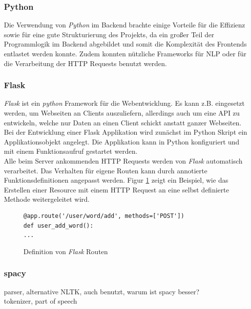 \subsubsection{Python}
\label{sec:python}

Die Verwendung von \textit{Python}\cite{vanRossum2011} im Backend brachte einige Vorteile für die Effizienz sowie für eine gute Strukturierung des Projekts, da ein großer Teil der Programmlogik im Backend abgebildet und somit die Komplexität des Frontends entlastet werden konnte. Zudem konnten nützliche Frameworks für NLP oder für die Verarbeitung der HTTP Requests benutzt werden.

\subsubsection{Flask}
\label{sec:flask}

\textit{Flask} ist ein \textit{python} Framework für die Webentwicklung. Es kann z.B. eingesetzt werden, um Webseiten an Clients auszuliefern, allerdings auch um eine API zu entwickeln, welche nur Daten an einen Client schickt anstatt ganzer Webseiten. Bei der Entwicklung einer Flask Applikation wird zunächst im Python Skript ein Applikationsobjekt angelegt. Die Applikation kann in Python konfiguriert und mit einem Funktionsaufruf gestartet werden.\\
Alle beim Server ankommenden HTTP Requests werden von \textit{Flask} automatisch verarbeitet. Das Verhalten für eigene Routen kann durch annotierte Funktionsdefinitionen angepasst werden. Figur \ref{fig:flask} zeigt ein Beispiel, wie das Erstellen einer Resource mit einem HTTP Request an eine selbst definierte Methode weitergeleitet wird.

\begin{figure}
	\begin{lstlisting}
@app.route('/user/word/add', methods=['POST'])
def user_add_word():
...
	\end{lstlisting}
	\caption{Definition von \textit{Flask} Routen}
	\label{fig:flask}
\end{figure}

\subsubsection{spacy}
\label{sec:spacy}
parser, alternative NLTK, auch benutzt, warum ist spacy besser?\\
tokenizer, part of speech

